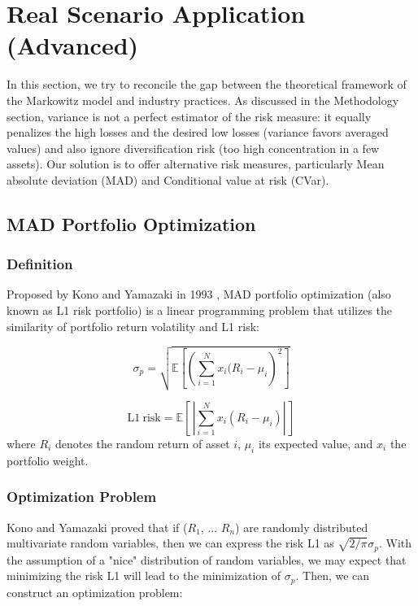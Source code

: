 \documentclass[12pt]{article}
\begin{document}
\section{Real Scenario Application (Advanced)}

In this section, we try to reconcile the gap between the theoretical framework of the Markowitz model and industry practices. As discussed in the Methodology section, variance is not a perfect estimator of the risk measure: it equally penalizes the high losses and the desired low losses (variance favors averaged values) and also ignore diversification risk (too high concentration in a few assets). Our solution is to offer alternative risk measures, particularly Mean absolute deviation (MAD) and Conditional value at risk (CVar). 

\subsection{MAD Portfolio Optimization}

\subsubsection{Definition}
Proposed by Kono and Yamazaki in 1993 \cite{konno1991}, MAD portfolio optimization (also known as L1 risk portfolio) is a linear programming problem that utilizes the similarity of portfolio return volatility and L1 risk: 

\begin{equation}
    \sigma_p = \sqrt{\mathbb{E}\!\left[\left(\sum_{i=1}^N x_i (R_i - \mu_i\right)^2\right]}
\end{equation}

\begin{equation}
    \mathrm{L1\ risk} = \mathbb{E}\!\left[\,|{\sum_{i=1}^N x_i (R_i - \mu_i)}|\,\right]
\end{equation}
where $R_i$ denotes the random return of asset $i$, $\mu_i$ its expected value, and $x_i$ the portfolio weight.

\subsubsection{Optimization Problem}
Kono and Yamazaki proved that if ({$R_1$, ... $R_n$}) are randomly distributed multivariate random variables, then we can express the risk L1 as $\sqrt{2/\pi}\sigma_p$. With the assumption of a "nice" distribution of random variables, we may expect that minimizing the risk L1 will lead to the minimization of $\sigma_p$. Then, we can construct an optimization problem:  
\end{document}
